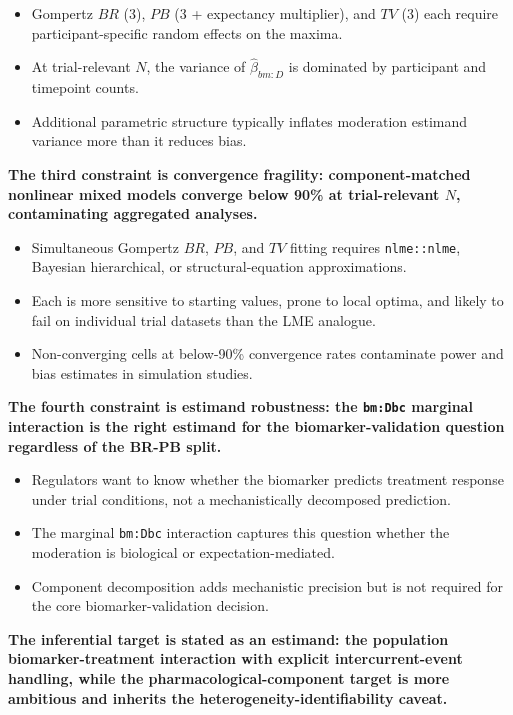 \documentclass[
  11pt,
]{article}
\begin{document}
\begin{itemize}\setlength{\itemsep}{2pt}\setlength{\parskip}{0pt}
\item Gompertz $BR$ (3), $PB$ (3 + expectancy multiplier), and $TV$ (3) each require participant-specific random effects on the maxima.
\item At trial-relevant $N$, the variance of $\hat\beta_{bm:D}$ is dominated by participant and timepoint counts.
\item Additional parametric structure typically inflates moderation estimand variance more than it reduces bias.
\end{itemize}

\textbf{The third constraint is convergence fragility: component-matched nonlinear mixed models converge below 90\% at trial-relevant $N$, contaminating aggregated analyses.}

\begin{itemize}\setlength{\itemsep}{2pt}\setlength{\parskip}{0pt}
\item Simultaneous Gompertz $BR$, $PB$, and $TV$ fitting requires \texttt{nlme::nlme}, Bayesian hierarchical, or structural-equation approximations.
\item Each is more sensitive to starting values, prone to local optima, and likely to fail on individual trial datasets than the LME analogue.
\item Non-converging cells at below-90\% convergence rates contaminate power and bias estimates in simulation studies.
\end{itemize}

\textbf{The fourth constraint is estimand robustness: the \texttt{bm:Dbc} marginal interaction is the right estimand for the biomarker-validation question regardless of the BR-PB split.}

\begin{itemize}\setlength{\itemsep}{2pt}\setlength{\parskip}{0pt}
\item Regulators want to know whether the biomarker predicts treatment response under trial conditions, not a mechanistically decomposed prediction.
\item The marginal \texttt{bm:Dbc} interaction captures this question whether the moderation is biological or expectation-mediated.
\item Component decomposition adds mechanistic precision but is not required for the core biomarker-validation decision.
\end{itemize}

\textbf{The inferential target is stated as an estimand: the population biomarker-treatment interaction with explicit intercurrent-event handling, while the pharmacological-component target is more ambitious and inherits the heterogeneity-identifiability caveat.}
\end{document}
